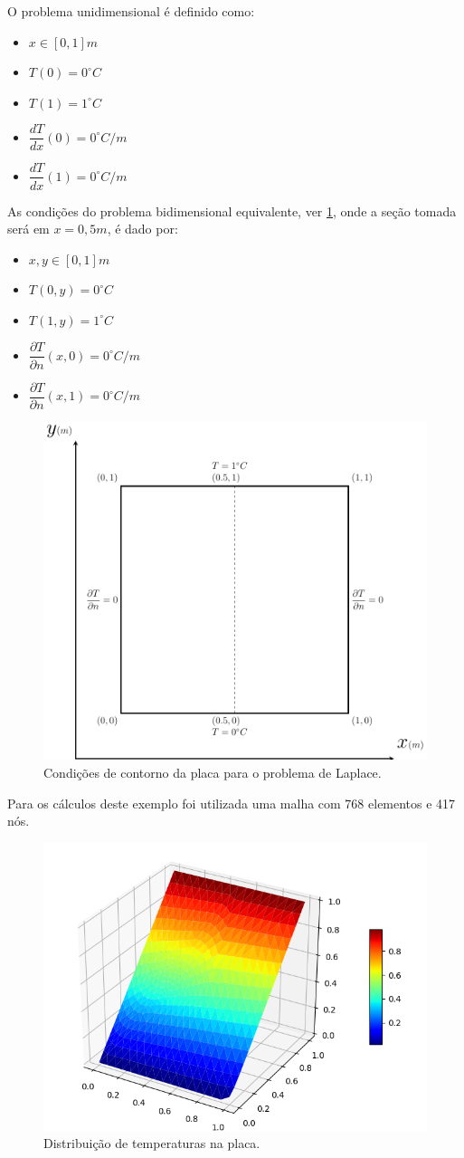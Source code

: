 O problema unidimensional é definido como:
\begin{itemize}
    \item $x\in [0,1]m$
    \item $T(0) = 0^{\circ}C$
    \item $T(1) = 1^{\circ}C$
    \item $\dfrac{dT}{dx}(0) = 0^{\circ}C/m$
    \item $\dfrac{dT}{dx}(1) = 0^{\circ}C/m$
\end{itemize}

As condições do problema bidimensional equivalente, ver \ref{laplace_d_bc}, onde a seção tomada será em $x=0,5m$, é dado por:
\begin{itemize}
    \item $x,y\in [0,1]m$
    \item $T(0,y) = 0^{\circ}C$
    \item $T(1,y) = 1^{\circ}C$
    \item $\dfrac{\partial T}{\partial n}(x,0) = 0^{\circ}C/m$
    \item $\dfrac{\partial T}{\partial n}(x,1) = 0^{\circ}C/m$
\end{itemize}

\begin{figure}[H]
    \centering
    \includegraphics[width=.7\linewidth]{figures/laplace_dirichlet_boundary_conditions.pdf}
    \caption{Condições de contorno da placa para o problema de Laplace.}
    \label{laplace_d_bc}
\end{figure}

Para os cálculos deste exemplo foi utilizada uma malha com 768 elementos e 417 nós.
\begin{figure}[H]
    \centering
    \includegraphics[width=.5\linewidth]{figures/laplace_dirichlet_permanent_3d.png}
    \caption{Distribuição de temperaturas na placa.}
    \label{laplace_d_3d}
\end{figure}

